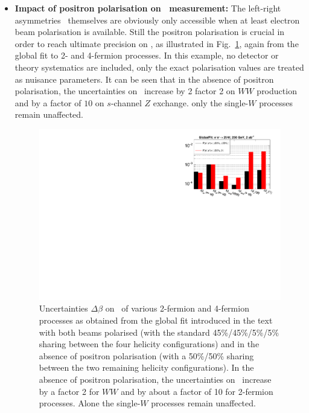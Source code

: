 \begin{itemize}
\item {\textbf{Impact of positron polarisation on \ALR\ measurement:}} The left-right asymmetries \ALR\ themselves are obviously only accessible when at least electron beam polarisation is available. Still the positron polarisation is crucial in order to reach ultimate precision on \ALR, as illustrated in Fig.~\ref{fig:beta_error_noposipol}, again from the global fit to 2- and 4-fermion processes. In this example, no detector or theory systematics are included, only the exact polarisation values are treated as nuisance parameters. It can be seen that in the absence of positron polarisation, the uncertainties on \ALR\ increase by 2 factor 2 on $WW$ production and by a factor of $10$ on $s$-channel $Z$ exchange. only the single-$W$ processes remain unaffected.


\begin{figure}
\centering
\includegraphics[width=0.95\linewidth]{./chapters/figures/beta_precision_upolarized.pdf}
		
\caption{Uncertainties $\Delta \beta$ on \ALR\ of various 2-fermion and 4-fermion processes as obtained from the global fit introduced in the text~\cite{bib:PhDRobert} with both beams polarised (with the standard 45\%/45\%/5\%/5\% sharing between the four helicity configurations) and in the absence of positron polarisation (with a 50\%/50\% sharing between the two remaining helicity configurations). In the absence of positron polarisation, the  uncertainties on \ALR\ increase by a factor 2 for $WW$ and by about a factor of 10 for 2-fermion processes. Alone the single-$W$ processes remain unaffected.}
\label{fig:beta_error_noposipol}
\end{figure}


\end{itemize}
